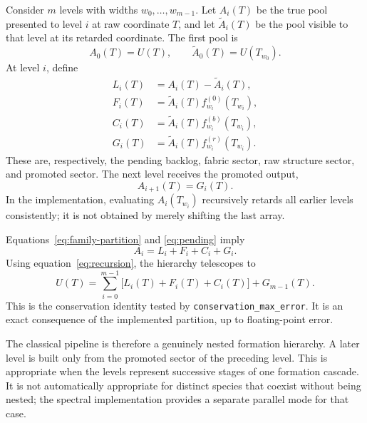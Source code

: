 \documentclass[11pt]{article}
\begin{document}
Consider $m$ levels with widths $w_0,\ldots,w_{m-1}$.  Let $A_i(T)$ be the
true pool presented to level $i$ at raw coordinate $T$, and let
$\widetilde A_i(T)$ be the pool visible to that level at its retarded
coordinate.  The first pool is
\begin{equation}
 A_0(T)=U(T),
 \qquad
 \widetilde A_0(T)=U(T_{w_0}).
 \label{eq:first-pool}
\end{equation}
At level $i$, define
\begin{align}
 L_i(T)&=A_i(T)-\widetilde A_i(T),
 \label{eq:pending}\\
 F_i(T)&=\widetilde A_i(T) f^{(0)}_{w_i}(T_{w_i}),
 \label{eq:fabric}\\
 C_i(T)&=\widetilde A_i(T) f^{(b)}_{w_i}(T_{w_i}),
 \label{eq:structure}\\
 G_i(T)&=\widetilde A_i(T) f^{(r)}_{w_i}(T_{w_i}).
 \label{eq:promoted}
\end{align}
These are, respectively, the pending backlog, fabric sector, raw structure
sector, and promoted sector.
The next level receives the promoted output,
\begin{equation}
 A_{i+1}(T)=G_i(T).
 \label{eq:recursion}
\end{equation}
In the implementation, evaluating $A_i(T_{w_i})$ recursively retards all
earlier levels consistently; it is not obtained by merely shifting the
last array.

Equations~\eqref{eq:family-partition} and \eqref{eq:pending} imply
\begin{equation}
 A_i=L_i+F_i+C_i+G_i.
 \label{eq:level-ledger}
\end{equation}
Using equation~\eqref{eq:recursion}, the hierarchy telescopes to
\begin{equation}
 \boxed{
 U(T)=\sum_{i=0}^{m-1}\bigl[L_i(T)+F_i(T)+C_i(T)\bigr]
      +G_{m-1}(T).}
 \label{eq:global-ledger}
\end{equation}
This is the conservation identity tested by
\texttt{conservation\_max\_error}.  It is an exact consequence of the
implemented partition, up to floating-point error.

The classical pipeline is therefore a genuinely nested formation hierarchy.
A later level is built only from the promoted sector of the preceding level.
This is appropriate when the levels represent successive stages of one
formation cascade.  It is not automatically appropriate for distinct
species that coexist without being nested; the spectral implementation
provides a separate parallel mode for that case.
\end{document}
